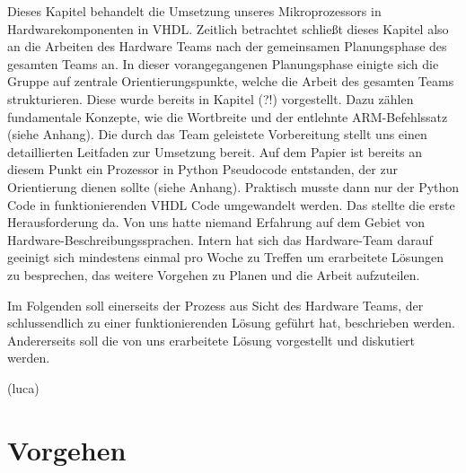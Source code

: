 \documentclass[paper=a4,fontsize=12pt,twocolumn]{scrreprt}
\begin{document}
Dieses Kapitel behandelt die Umsetzung unseres Mikroprozessors in Hardwarekomponenten in VHDL.
Zeitlich betrachtet schließt dieses Kapitel also an die Arbeiten des Hardware Teams nach der gemeinsamen Planungsphase des gesamten Teams an.
In dieser vorangegangenen Planungsphase einigte sich die Gruppe auf zentrale Orientierungspunkte, welche die Arbeit des gesamten Teams strukturieren.
Diese wurde bereits in Kapitel (?!) vorgestellt.
Dazu zählen fundamentale Konzepte, wie die Wortbreite und der entlehnte ARM-Befehlssatz (siehe Anhang).
Die durch das Team geleistete Vorbereitung stellt uns einen detaillierten Leitfaden zur Umsetzung bereit.
Auf dem Papier ist bereits an diesem Punkt ein Prozessor in Python Pseudocode entstanden, der zur Orientierung dienen sollte (siehe Anhang).
Praktisch musste dann nur der Python Code in funktionierenden VHDL Code umgewandelt werden.
Das stellte die erste Herausforderung da.
Von uns hatte niemand Erfahrung auf dem Gebiet von Hardware-Beschreibungssprachen.
Intern hat sich das Hardware-Team darauf geeinigt sich mindestens einmal pro Woche zu Treffen um erarbeitete Lösungen zu besprechen, das weitere Vorgehen zu Planen und die Arbeit aufzuteilen.

Im Folgenden soll einerseits der Prozess aus Sicht des Hardware Teams, der schlussendlich zu einer funktionierenden Lösung geführt hat, beschrieben werden.
Andererseits soll die von uns erarbeitete Lösung vorgestellt und diskutiert werden.


(luca)

\section{Vorgehen}
\end{document}
